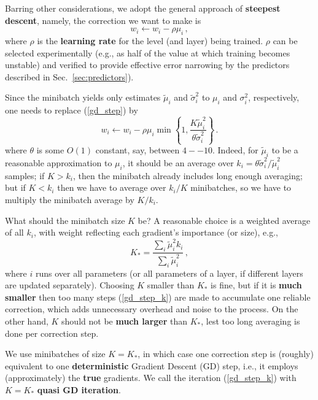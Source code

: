\documentclass{article} %
\begin{document}
Barring other considerations, we adopt the general approach of \textbf{steepest descent}, namely, the correction we want to make is
\begin{equation}
  w_i \longleftarrow w_i - \rho \mu_i\,,
  \label{gd_step}
\end{equation}
where $\rho$ is the \textbf{learning rate} for the level (and layer) being trained. $\rho$ can be selected  experimentally (e.g., as half of the value at which training becomes unstable) and verified to provide effective error narrowing by the predictors described in Sec.~\ref{sec:predictors}).

Since the minibatch yields only estimates $\tilde{\mu}_i$ and $\tilde{\sigma}_i^2$ to $\mu_i$ and $\sigma_i^2$, respectively, one needs to replace (\ref{gd_step}) by
\begin{equation}
  w_i \longleftarrow w_i - \rho \mu_i \min\left\{ 1, \frac{K \tilde{\mu}_i^2}{\theta \tilde{\sigma}_i^2} \right\}\,.
  \label{gd_step_k}
\end{equation}
where $\theta$ is some $O(1)$ constant, say, between $4--10$. Indeed, for $\tilde{\mu}_i$ to be a reasonable approximation to $\mu_i$, it should be an average over $k_i = \theta \tilde{\sigma}_i^2/\tilde{\mu}_i^2$ samples; if $K > k_i$, then the minibatch already includes long enough averaging; but if $K < k_i$ then we have to average over $k_i/K$ minibatches, so we have to multiply the minibatch average by $K/k_i$.

What should the minibatch size $K$ be? A reasonable choice is a weighted average of all $k_i$, with weight reflecting each gradient's importance (or size), e.g.,
\begin{equation}
  K_* = \frac{\sum_i \tilde{\mu}_i^2 k_i}{\sum_i \tilde{\mu}_i^2}\,,
  \label{k_star}
\end{equation}
where $i$ runs over all parameters (or all parameters of a layer, if different layers are updated separately). Choosing $K$ smaller than $K_*$ is fine, but if it is \textbf{much smaller} then too many steps (\ref{gd_step_k}) are made to accumulate one reliable correction, which adds unnecessary overhead and noise to the process. On the other hand, $K$ should not be \textbf{much larger} than $K_*$, lest too long averaging is done per correction step.

We use minibatches of size $K = K_*$, in which case one correction step is (roughly) equivalent to one \textbf{deterministic} Gradient Descent (GD) step, i.e., it employs (approximately) the \textbf{true} gradients. We call the iteration (\ref{gd_step_k}) with $K = K_*$ \textbf{quasi GD iteration}.
\end{document}
